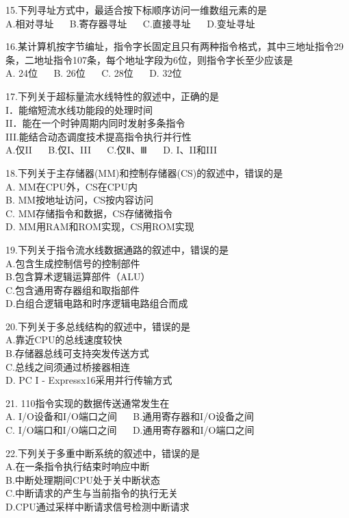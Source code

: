 15.下列寻址方式中，最适合按下标顺序访问一维数组元素的是 \\
A.相对寻址 $\quad$ B.寄存器寻址 $\quad$ C.直接寻址 $\quad$ D.变址寻址

16.某计算机按字节编址，指令字长固定且只有两种指令格式，其中三地址指令29条，二地址指令107条，每个地址字段为6位，则指令字长至少应该是 \\
A. 24位  $\quad$  B. 26位  $\quad$  C. 28位  $\quad$  D. 32位

17.下列关于超标量流水线特性的叙述中，正确的是 \\
I．能缩短流水线功能段的处理时间 \\
II．能在一个时钟周期内同时发射多条指令 \\
III.能结合动态调度技术提高指令执行并行性 \\
A.仅II  $\quad$  B.仅I、III  $\quad$  C.仅Ⅱ、Ⅲ  $\quad$  D.  I、II和III

18.下列关于主存储器(MM)和控制存储器(CS)的叙述中，错误的是 \\
A. MM在CPU外，CS在CPU内 \\
B. MM按地址访问，CS按内容访问 \\
C. MM存储指令和数据，CS存储微指令 \\
D. MM用RAM和ROM实现，CS用ROM实现

19.下列关于指令流水线数据通路的叙述中，错误的是 \\
A.包含生成控制信号的控制部件 \\
B.包含算术逻辑运算部件（ALU） \\
C.包含通用寄存器组和取指部件 \\
D.白组合逻辑电路和时序逻辑电路组合而成

20.下列关于多总线结构的叙述中，错误的是 \\
A.靠近CPU的总线速度较快 \\
B.存储器总线可支持突发传送方式 \\
C.总线之间须通过桥接器相连 \\
D.  PC I - Expressx16采用并行传输方式

21. 110指令实现的数据传送通常发生在 \\
A. I/O设备和I/O端口之间  $\quad$  B.通用寄存器和I/O设备之间 \\
C. I/O端口和I/O端口之间  $\quad$  D.通用寄存器和I/O端口之间

22.下列关于多重中断系统的叙述中，错误的是 \\
A.在一条指令执行结束时响应中断 \\
B.中断处理期间CPU处于关中断状态 \\
C.中断请求的产生与当前指令的执行无关 \\
D.CPU通过采样中断请求信号检测中断请求 \\


